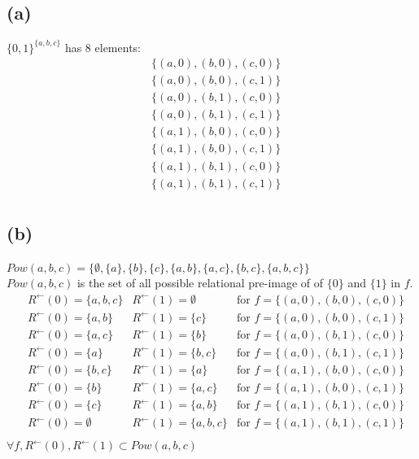 \documentclass{article} %
\begin{document}
\subsection*{(a)}
$\{0, 1\}^{\{a,b,c\}}$ has 8 elements:\\
\[\begin{array}{rlcr}
&\{(a,0),(b,0),(c,0)\}\\
&\{(a,0),(b,0),(c,1)\}\\
&\{(a,0),(b,1),(c,0)\}\\
&\{(a,0),(b,1),(c,1)\}\\
&\{(a,1),(b,0),(c,0)\}\\
&\{(a,1),(b,0),(c,1)\}\\
&\{(a,1),(b,1),(c,0)\}\\
&\{(a,1),(b,1),(c,1)\}\\
\end{array}\]
\subsection*{(b)}
$Pow(a,b,c)=\{\emptyset,\{a\},\{b\},\{c\},\{a,b\},\{a,c\},\{b,c\},\{a,b,c\}\}$\\
$Pow(a,b,c)$ is the set of all possible relational pre-image of of $\{0\}$ and $\{1\}$ in $\mathit{f}$.
\[\begin{array}{rlcr}
&R^{\gets}(0)=\{a,b,c\}	&R^{\gets}(1)=\emptyset	&\mbox{for }\mathit{f}=\{(a,0),(b,0),(c,0)\}\\
&R^{\gets}(0)=\{a,b\}	&R^{\gets}(1)=\{c\}		&\mbox{for }\mathit{f}=\{(a,0),(b,0),(c,1)\}\\
&R^{\gets}(0)=\{a,c\}	&R^{\gets}(1)=\{b\}		&\mbox{for }\mathit{f}=\{(a,0),(b,1),(c,0)\}\\
&R^{\gets}(0)=\{a\}		&R^{\gets}(1)=\{b,c\}	&\mbox{for }\mathit{f}=\{(a,0),(b,1),(c,1)\}\\
&R^{\gets}(0)=\{b,c\}	&R^{\gets}(1)=\{a\}		&\mbox{for }\mathit{f}=\{(a,1),(b,0),(c,0)\}\\
&R^{\gets}(0)=\{b\}		&R^{\gets}(1)=\{a,c\}	&\mbox{for }\mathit{f}=\{(a,1),(b,0),(c,1)\}\\
&R^{\gets}(0)=\{c\}		&R^{\gets}(1)=\{a,b\}	&\mbox{for }\mathit{f}=\{(a,1),(b,1),(c,0)\}\\
&R^{\gets}(0)=\emptyset	&R^{\gets}(1)=\{a,b,c\}	&\mbox{for }\mathit{f}=\{(a,1),(b,1),(c,1)\}\\
\end{array}\]
$\forall \mathit{f}, R^{\gets}(0),R^{\gets}(1) \subset Pow(a,b,c)$\\
\end{document}
